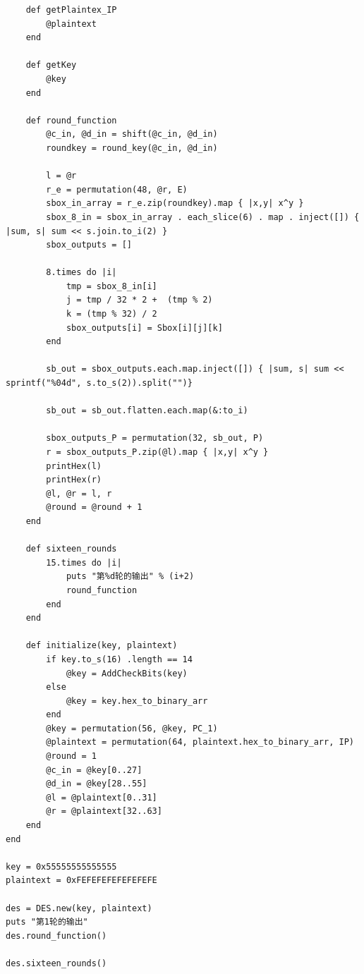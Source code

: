 \documentclass[10pt,a4paper]{article}
\begin{document}
\begin{verbatim}
    def getPlaintex_IP
        @plaintext
    end

    def getKey
        @key
    end

    def round_function
        @c_in, @d_in = shift(@c_in, @d_in) 
        roundkey = round_key(@c_in, @d_in)

        l = @r
        r_e = permutation(48, @r, E)
        sbox_in_array = r_e.zip(roundkey).map { |x,y| x^y }
        sbox_8_in = sbox_in_array . each_slice(6) . map . inject([]) { |sum, s| sum << s.join.to_i(2) }
        sbox_outputs = []

        8.times do |i|
            tmp = sbox_8_in[i]
            j = tmp / 32 * 2 +  (tmp % 2)
            k = (tmp % 32) / 2
            sbox_outputs[i] = Sbox[i][j][k]
        end

        sb_out = sbox_outputs.each.map.inject([]) { |sum, s| sum << sprintf("%04d", s.to_s(2)).split("")}

        sb_out = sb_out.flatten.each.map(&:to_i)
        
        sbox_outputs_P = permutation(32, sb_out, P)
        r = sbox_outputs_P.zip(@l).map { |x,y| x^y }
        printHex(l)
        printHex(r)
        @l, @r = l, r
        @round = @round + 1
    end

    def sixteen_rounds
        15.times do |i|
            puts "第%d轮的输出" % (i+2)
            round_function
        end
    end

    def initialize(key, plaintext)
        if key.to_s(16) .length == 14
            @key = AddCheckBits(key)
        else
            @key = key.hex_to_binary_arr
        end
        @key = permutation(56, @key, PC_1)
        @plaintext = permutation(64, plaintext.hex_to_binary_arr, IP)
        @round = 1
        @c_in = @key[0..27]
        @d_in = @key[28..55]
        @l = @plaintext[0..31]
        @r = @plaintext[32..63]
    end
end

key = 0x55555555555555
plaintext = 0xFEFEFEFEFEFEFEFE

des = DES.new(key, plaintext)
puts "第1轮的输出"
des.round_function()

des.sixteen_rounds()
  \end{verbatim}
\end{document}
